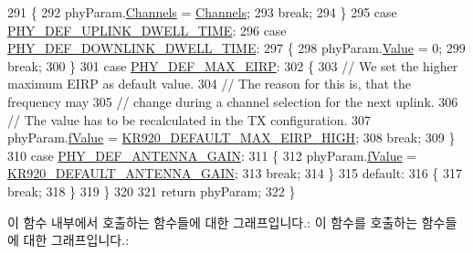 \begin{DoxyCode}
291         \{
292             phyParam.\mbox{\hyperlink{unionu_phy_param_afecbd1e457cbd79eb7072bd140ff33d4}{Channels}} = \mbox{\hyperlink{_region_k_r920_8c_aa22cc2ed5f1e155ccf4f0c0388da513e}{Channels}};
293             \textcolor{keywordflow}{break};
294         \}
295         \textcolor{keywordflow}{case} \mbox{\hyperlink{group___r_e_g_i_o_n_gga51cbe8f5433d914fe9cf81b451de2c2dab35cca5e0dae3d87e02c8c80e4d4685e}{PHY\_DEF\_UPLINK\_DWELL\_TIME}}:
296         \textcolor{keywordflow}{case} \mbox{\hyperlink{group___r_e_g_i_o_n_gga51cbe8f5433d914fe9cf81b451de2c2da8e29179691bf6520256a7af0cabae6ad}{PHY\_DEF\_DOWNLINK\_DWELL\_TIME}}:
297         \{
298             phyParam.\mbox{\hyperlink{unionu_phy_param_a8e0dcce3428a8051614e852b8836d0d1}{Value}} = 0;
299             \textcolor{keywordflow}{break};
300         \}
301         \textcolor{keywordflow}{case} \mbox{\hyperlink{group___r_e_g_i_o_n_gga51cbe8f5433d914fe9cf81b451de2c2da5bdce0ffd449781819a0d87732ebd2b7}{PHY\_DEF\_MAX\_EIRP}}:
302         \{
303             \textcolor{comment}{// We set the higher maximum EIRP as default value.}
304             \textcolor{comment}{// The reason for this is, that the frequency may}
305             \textcolor{comment}{// change during a channel selection for the next uplink.}
306             \textcolor{comment}{// The value has to be recalculated in the TX configuration.}
307             phyParam.\mbox{\hyperlink{unionu_phy_param_ad30735f839c3c7592fc5bc5390c45715}{fValue}} = \mbox{\hyperlink{group___r_e_g_i_o_n_k_r920_ga616f9bdfacc11e6345f7fb99f0c19471}{KR920\_DEFAULT\_MAX\_EIRP\_HIGH}};
308             \textcolor{keywordflow}{break};
309         \}
310         \textcolor{keywordflow}{case} \mbox{\hyperlink{group___r_e_g_i_o_n_gga51cbe8f5433d914fe9cf81b451de2c2da37b73a543ea79ce58bf18035329ba773}{PHY\_DEF\_ANTENNA\_GAIN}}:
311         \{
312             phyParam.\mbox{\hyperlink{unionu_phy_param_ad30735f839c3c7592fc5bc5390c45715}{fValue}} = \mbox{\hyperlink{group___r_e_g_i_o_n_k_r920_gae51311387812d676bdc5dea935791713}{KR920\_DEFAULT\_ANTENNA\_GAIN}};
313             \textcolor{keywordflow}{break};
314         \}
315         \textcolor{keywordflow}{default}:
316         \{
317             \textcolor{keywordflow}{break};
318         \}
319     \}
320 
321     \textcolor{keywordflow}{return} phyParam;
322 \}
\end{DoxyCode}
이 함수 내부에서 호출하는 함수들에 대한 그래프입니다.\+:
이 함수를 호출하는 함수들에 대한 그래프입니다.\+:
\mbox{\label{group___r_e_g_i_o_n_k_r920_gad6e5f4b30063e9fbd8f6e1b6dea1444d}} 
